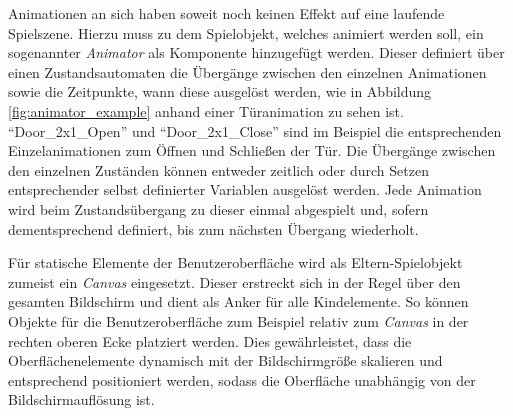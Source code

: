 Animationen an sich haben soweit noch keinen Effekt auf eine laufende Spielszene. Hierzu muss zu dem Spielobjekt, welches animiert werden soll, ein sogenannter \textit{Animator} \cite{Unity_Doc_Animator} als Komponente hinzugefügt werden. Dieser definiert über einen Zustandsautomaten die Übergänge zwischen den einzelnen Animationen sowie die Zeitpunkte, wann diese ausgelöst werden, wie in Abbildung \ref{fig:animator_example} anhand einer Türanimation zu sehen ist. "`Door\_2x1\_Open"' und "`Door\_2x1\_Close"' sind im Beispiel die entsprechenden Einzelanimationen zum Öffnen und Schließen der Tür. Die Übergänge zwischen den einzelnen Zuständen können entweder zeitlich oder durch Setzen entsprechender selbst definierter Variablen ausgelöst werden. Jede Animation wird beim Zustandsübergang zu dieser einmal abgespielt und, sofern dementsprechend definiert, bis zum nächsten Übergang wiederholt.

Für statische Elemente der Benutzeroberfläche wird als Eltern-Spielobjekt zumeist ein \textit{Canvas} \cite{Unity_Doc_Canvas} eingesetzt. Dieser erstreckt sich in der Regel über den gesamten Bildschirm und dient als Anker für alle Kindelemente. So können Objekte für die Benutzeroberfläche zum Beispiel relativ zum \textit{Canvas} in der rechten oberen Ecke platziert werden. Dies gewährleistet, dass die Oberflächenelemente dynamisch mit der Bildschirmgröße skalieren und entsprechend positioniert werden, sodass die Oberfläche unabhängig von der Bildschirmauflösung ist.